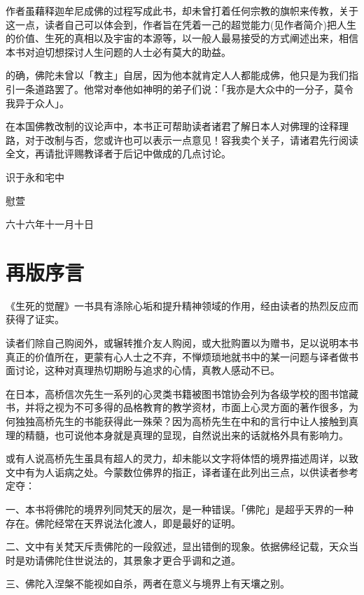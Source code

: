 \documentclass[twoside,openany]{book}
\begin{document}
作者虽藉释迦牟尼成佛的过程写成此书，却未曾打着任何宗教的旗帜来传教，关于这一点，读者自己可以体会到，作者旨在凭着一己的超觉能力(见作者简介)把人生的价值、生死的真相以及宇宙的本源等，以一般人最易接受的方式阐述出来，相信本书对迫切想探讨人生问题的人士必有莫大的助益。

的确，佛陀未曾以「教主」自居，因为他本就肯定人人都能成佛，他只是为我们指引一条道路罢了。他常对奉他如神明的弟子们说：「我亦是大众中的一分子，莫令我异于众人」。

在本国佛教改制的议论声中，本书正可帮助读者诸君了解日本人对佛理的诠释理路，对于改制与否，您或许也可以表示一点意见！容我卖个关子，请诸君先行阅读全文，再请批评赐教译者于后记中做成的几点讨论。

\begin{flushright}
	识于永和宅中\hspace{.5cm}

慰萱\hspace{1.5cm}

  六十六年十一月十日
\end{flushright}

\chapter*{再版序言}
《生死的觉醒》一书具有涤除心垢和提升精神领域的作用，经由读者的热烈反应而获得了证实。

读者们除自己购阅外，或辗转推介友人购阅，或大批购置以为赠书，足以说明本书真正的价值所在，更蒙有心人士之不弃，不惮烦琐地就书中的某一问题与译者做书面讨论，这种对真理热切期盼与追求的心情，真教人感动不已。

在日本，高桥信次先生一系列的心灵类书籍被图书馆协会列为各级学校的图书馆藏书，并将之视为不可多得的品格教育的教学资材，市面上心灵方面的著作很多，为何独独高桥先生的书能获得此一殊荣？因为高桥先生在中和的言行中让人接触到真理的精髓，也可说他本身就是真理的显现，自然说出来的话就格外具有影响力。

或有人说高桥先生虽具有超人的灵力，却未能以文字将体悟的境界描述周详，以致文中有为人诟病之处。今蒙数位佛界的指正，译者谨在此列出三点，以供读者参考定夺：

一、本书将佛陀的境界列同梵天的层次，是一种错误。「佛陀」是超乎天界的一种存在。佛陀经常在天界说法化渡人，即是最好的证明。

二、文中有关梵天斥责佛陀的一段叙述，显出错倒的现象。依据佛经记载，天众当时是劝请佛陀住世说法的，其景象才更合乎调和之道。

三、佛陀入涅槃不能视如自杀，两者在意义与境界上有天壤之别。
\end{document}
